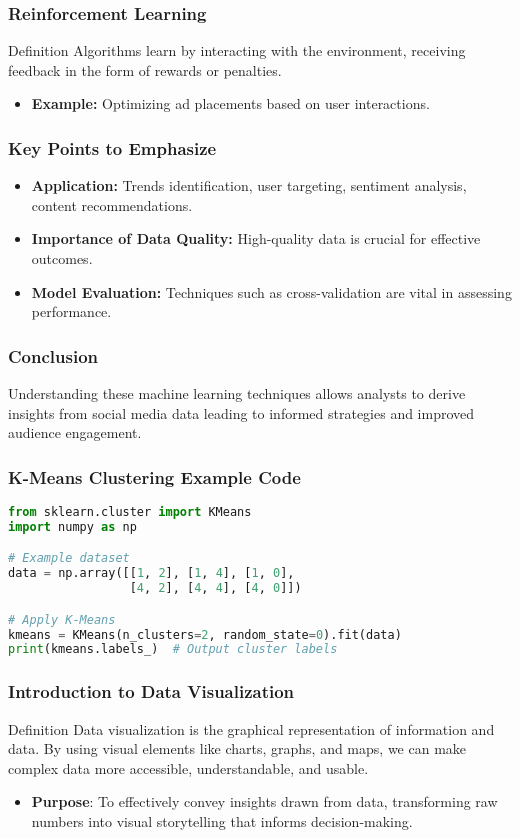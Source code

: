 \documentclass{beamer}
\begin{document}
\begin{frame}[fragile]
    \frametitle{Reinforcement Learning}
    \begin{block}{Definition}
        Algorithms learn by interacting with the environment, receiving feedback in the form of rewards or penalties.
    \end{block}
    \begin{itemize}
        \item \textbf{Example:} Optimizing ad placements based on user interactions.
    \end{itemize}
\end{frame}

\begin{frame}[fragile]
    \frametitle{Key Points to Emphasize}
    \begin{itemize}
        \item \textbf{Application:} Trends identification, user targeting, sentiment analysis, content recommendations.
        \item \textbf{Importance of Data Quality:} High-quality data is crucial for effective outcomes.
        \item \textbf{Model Evaluation:} Techniques such as cross-validation are vital in assessing performance.
    \end{itemize}
\end{frame}

\begin{frame}[fragile]
    \frametitle{Conclusion}
    Understanding these machine learning techniques allows analysts to derive insights from social media data leading to informed strategies and improved audience engagement.
\end{frame}

\begin{frame}[fragile]
    \frametitle{K-Means Clustering Example Code}
    \begin{lstlisting}[language=Python]
from sklearn.cluster import KMeans
import numpy as np

# Example dataset
data = np.array([[1, 2], [1, 4], [1, 0],
                 [4, 2], [4, 4], [4, 0]])

# Apply K-Means
kmeans = KMeans(n_clusters=2, random_state=0).fit(data)
print(kmeans.labels_)  # Output cluster labels
    \end{lstlisting}
\end{frame}

\begin{frame}[fragile]
    \frametitle{Introduction to Data Visualization}
    \begin{block}{Definition}
        Data visualization is the graphical representation of information and data. By using visual elements like charts, graphs, and maps, we can make complex data more accessible, understandable, and usable.
    \end{block}
    \begin{itemize}
        \item \textbf{Purpose}: To effectively convey insights drawn from data, transforming raw numbers into visual storytelling that informs decision-making.
    \end{itemize}
\end{frame}
\end{document}
